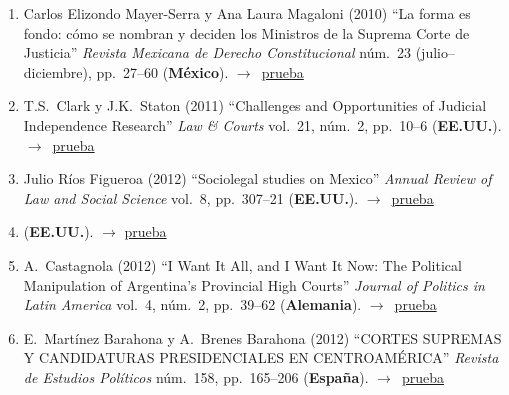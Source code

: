 \documentclass[12 pt, letter]{article}
\newenvironment{CitasMiTrabajo}{
    \begin{footnotesize}
    \begin{enumerate}[label={\footnotesize\emph{cita~\arabic*}},ref=\arabic*] %
        \setlength{\itemsep}{.1\itemsep}
        \setlength{\parskip}{.1\parskip}
    }{\end{enumerate}\end{footnotesize}}
\begin{document}
        \begin{CitasMiTrabajo}

        \item Carlos Elizondo Mayer-Serra y Ana Laura Magaloni (2010) ``La forma es fondo: c\'omo se nombran y deciden los Ministros de la Suprema Corte de Justicia'' \emph{Revista Mexicana de Derecho Constitucional} n\'um.~23 (julio--diciembre), pp.~27--60 (\textbf{M\'exico}). $\rightarrow$~\href{https://github.com/emagar/cv/blob/master/citasMiTrab/sanchMagalMagarChapter/MAGALONIELIZONDO2010cc23.pdf}{prueba}

        \item T.S.~Clark y J.K.~Staton  (2011) ``Challenges and Opportunities of Judicial Independence Research'' \emph{Law \& Courts} vol.~21, n\'um.~2, pp.~10--6 (\textbf{EE.UU.}). $\rightarrow$~\href{https://github.com/emagar/cv/blob/master/citasMiTrab/sanchMagalMagarChapter/clark.staton2011.pdf}{prueba}

        \item Julio R\'ios Figueroa (2012) ``Sociolegal studies on Mexico'' \emph{Annual Review of Law and Social Science} vol.~8, pp.~307--21 (\textbf{EE.UU.}). $\rightarrow$~\href{https://github.com/emagar/cv/blob/master/citasMiTrab/sanchMagalMagarChapter/riosSociolegalMex2012.pdf}{prueba}

        \item {} (\textbf{EE.UU.}). $\rightarrow$ \href{https://github.com/emagar/cv/blob/master/citasMiTrab/sanchMagalMagarChapter/carroll.tiedeVotingTribChile2012jhr.pdf}{prueba}

        \item A.~Castagnola (2012) ``I Want It All, and I Want It Now: The Political Manipulation of Argentina's Provincial High Courts'' \emph{Journal of Politics in Latin America} vol.~4, n\'um.~2, pp.~39--62 (\textbf{Alemania}). $\rightarrow$~\href{https://github.com/emagar/cv/blob/master/citasMiTrab/sanchMagalMagarChapter/castagnolaArgProvCourts2012jpla.pdf}{prueba}

        \item E.~Mart\'inez Barahona y A.~Brenes Barahona (2012) ``CORTES SUPREMAS Y CANDIDATURAS PRESIDENCIALES EN CENTROAM\'ERICA'' \emph{Revista de Estudios Pol\'iticos} n\'um.~158, pp.~165--206 (\textbf{Espa\~na}). $\rightarrow$~\href{https://github.com/emagar/cv/blob/master/citasMiTrab/sanchMagalMagarChapter/mtnzBarahonaCortesCandPres2012rep.pdf}{prueba}


\end{CitasMiTrabajo}
\end{document}
